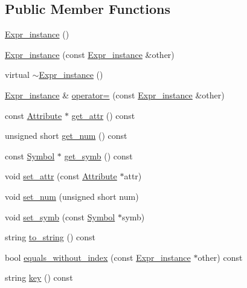 \subsection*{Public Member Functions}
\begin{DoxyCompactItemize}
\item 
\hyperlink{classgenevalmag_1_1Expr__instance_af83f87581558a7d2c05f18a1678050a2}{Expr\_\-instance} ()
\item 
\hyperlink{classgenevalmag_1_1Expr__instance_a52ec40835f95f35c7131036873e1a14d}{Expr\_\-instance} (const \hyperlink{classgenevalmag_1_1Expr__instance}{Expr\_\-instance} \&other)
\item 
virtual \hyperlink{classgenevalmag_1_1Expr__instance_a94630f2be9c5cceb11992086b34c52a4}{$\sim$Expr\_\-instance} ()
\item 
\hyperlink{classgenevalmag_1_1Expr__instance}{Expr\_\-instance} \& \hyperlink{classgenevalmag_1_1Expr__instance_a4af9be1f881e4c3aa29d548477fb1c7c}{operator=} (const \hyperlink{classgenevalmag_1_1Expr__instance}{Expr\_\-instance} \&other)
\item 
const \hyperlink{classgenevalmag_1_1Attribute}{Attribute} $\ast$ \hyperlink{classgenevalmag_1_1Expr__instance_a18d92b87a30dbf2ca3833e075f76d52e}{get\_\-attr} () const 
\item 
unsigned short \hyperlink{classgenevalmag_1_1Expr__instance_a5b5bc716afa9f85418c7f58ed0ac0c01}{get\_\-num} () const 
\item 
const \hyperlink{classgenevalmag_1_1Symbol}{Symbol} $\ast$ \hyperlink{classgenevalmag_1_1Expr__instance_a5327a138bd6dc934ce89d878d973bfb0}{get\_\-symb} () const 
\item 
void \hyperlink{classgenevalmag_1_1Expr__instance_a66ddf26666df395c4da1abab5f8d22a9}{set\_\-attr} (const \hyperlink{classgenevalmag_1_1Attribute}{Attribute} $\ast$attr)
\item 
void \hyperlink{classgenevalmag_1_1Expr__instance_abcd585b490f6fb7ad56de91287853a37}{set\_\-num} (unsigned short num)
\item 
void \hyperlink{classgenevalmag_1_1Expr__instance_ab1ba139af4ef942599e8882e7201e1f5}{set\_\-symb} (const \hyperlink{classgenevalmag_1_1Symbol}{Symbol} $\ast$symb)
\item 
string \hyperlink{classgenevalmag_1_1Expr__instance_a2186bb2f69173f709cfb75435b32da94}{to\_\-string} () const 
\item 
bool \hyperlink{classgenevalmag_1_1Expr__instance_afc3206f63c77c3fc8bbfdf4d2ef7de2e}{equals\_\-without\_\-index} (const \hyperlink{classgenevalmag_1_1Expr__instance}{Expr\_\-instance} $\ast$other) const 
\item 
string \hyperlink{classgenevalmag_1_1Expr__instance_a0a08cd791001f10ccb4020c5b9279823}{key} () const 
\end{DoxyCompactItemize}
